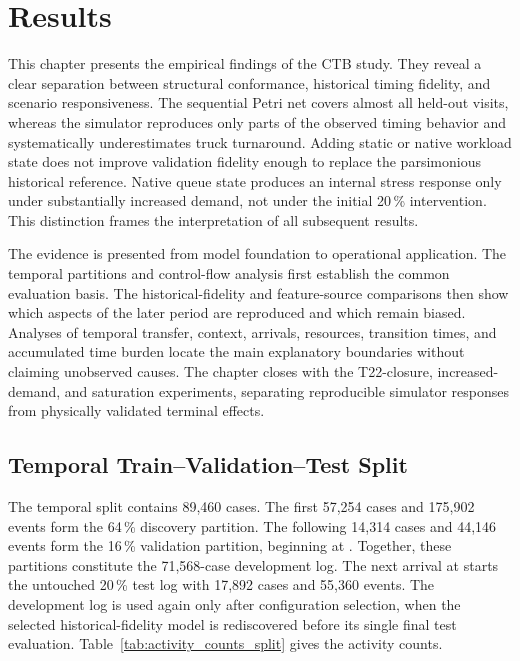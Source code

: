 \chapter{Results}
\label{chap:results}

This chapter presents the empirical findings of the CTB study. They reveal a
clear separation between structural conformance, historical timing fidelity,
and scenario responsiveness. The sequential Petri net covers almost all
held-out visits, whereas the simulator reproduces only parts of the observed
timing behavior and systematically underestimates truck turnaround. Adding
static or native workload state does not improve validation fidelity enough to
replace the parsimonious historical reference. Native queue state produces an
internal stress response only under substantially increased demand, not under
the initial 20\,\% intervention. This distinction frames the interpretation
of all subsequent results.

The evidence is presented from model foundation to operational application.
The temporal partitions and control-flow analysis first establish the common
evaluation basis. The historical-fidelity and feature-source comparisons then
show which aspects of the later period are reproduced and which remain biased.
Analyses of temporal transfer, context, arrivals, resources, transition times,
and accumulated time burden locate the main explanatory boundaries without
claiming unobserved causes. The chapter closes with the T22-closure,
increased-demand, and saturation experiments, separating reproducible simulator
responses from physically validated terminal effects.

\section{Temporal Train--Validation--Test Split}
\label{sec:results_eventlog_char}

The temporal split contains 89,460 cases. The first 57,254 cases and 175,902
events form the 64\,\% discovery partition. The following 14,314 cases and
44,146 events form the 16\,\% validation partition, beginning at
. Together, these partitions constitute the 71,568-case
development log. The next arrival at  starts the
untouched 20\,\% test log with 17,892 cases and 55,360 events. The development
log is used again only after configuration selection, when the selected
historical-fidelity model is rediscovered before its single final test
evaluation.
Table~\ref{tab:activity_counts_split} gives the activity counts.

